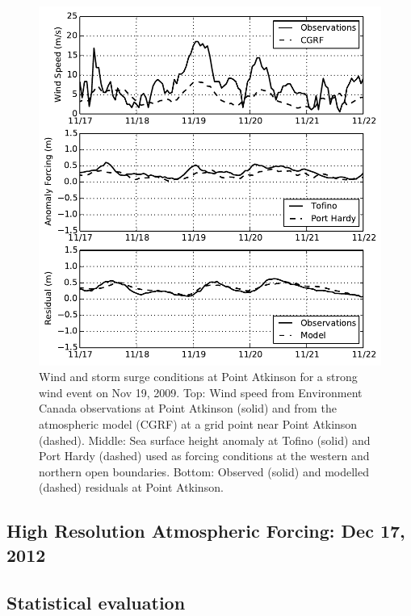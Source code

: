 \documentclass[pdftex,10pt]{article}
\begin{document}
\begin{figure}
\centering
\includegraphics[scale=0.6]{Figures/nov2009.pdf}
\caption{Wind and storm surge conditions at Point Atkinson for a strong wind event on Nov 19, 2009. Top: Wind speed from Environment Canada observations at Point Atkinson (solid) and from the atmospheric model (CGRF) at a grid point near Point Atkinson (dashed). Middle: Sea surface height anomaly at Tofino (solid) and Port Hardy (dashed) used as forcing conditions at the western and northern open boundaries. Bottom: Observed (solid) and modelled (dashed) residuals at Point Atkinson.  }
\label{fig:nov2009}
\end{figure}

\subsection{High Resolution Atmospheric Forcing: Dec 17, 2012}

\subsection{Statistical evaluation}
\citep{bernier2006predicting}
\end{document}
